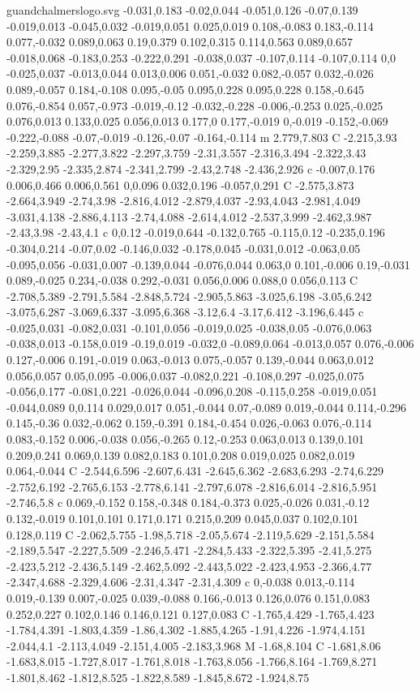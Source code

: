 \begin{filecontents}[noheader]{guandchalmerslogo.svg}
-0.031,0.183 -0.02,0.044 -0.051,0.126 -0.07,0.139 -0.019,0.013 -0.045,0.032 -0.019,0.051 0.025,0.019 0.108,-0.083 0.183,-0.114 0.077,-0.032 0.089,0.063 0.19,0.379 0.102,0.315 0.114,0.563 0.089,0.657 -0.018,0.068 -0.183,0.253 -0.222,0.291 -0.038,0.037 -0.107,0.114 -0.107,0.114 0,0 -0.025,0.037 -0.013,0.044 0.013,0.006 0.051,-0.032 0.082,-0.057 0.032,-0.026 0.089,-0.057 0.184,-0.108 0.095,-0.05 0.095,0.228 0.095,0.228 0.158,-0.645 0.076,-0.854 0.057,-0.973 -0.019,-0.12 -0.032,-0.228 -0.006,-0.253 0.025,-0.025 0.076,0.013 0.133,0.025 0.056,0.013 0.177,0 0.177,-0.019 0,-0.019 -0.152,-0.069 -0.222,-0.088 -0.07,-0.019 -0.126,-0.07 -0.164,-0.114 m 2.779,7.803 C -2.215,3.93 -2.259,3.885 -2.277,3.822 -2.297,3.759 -2.31,3.557 -2.316,3.494 -2.322,3.43 -2.329,2.95 -2.335,2.874 -2.341,2.799 -2.43,2.748 -2.436,2.926 c -0.007,0.176 0.006,0.466 0.006,0.561 0,0.096 0.032,0.196 -0.057,0.291 C -2.575,3.873 -2.664,3.949 -2.74,3.98 -2.816,4.012 -2.879,4.037 -2.93,4.043 -2.981,4.049 -3.031,4.138 -2.886,4.113 -2.74,4.088 -2.614,4.012 -2.537,3.999 -2.462,3.987 -2.43,3.98 -2.43,4.1 c 0,0.12 -0.019,0.644 -0.132,0.765 -0.115,0.12 -0.235,0.196 -0.304,0.214 -0.07,0.02 -0.146,0.032 -0.178,0.045 -0.031,0.012 -0.063,0.05 -0.095,0.056 -0.031,0.007 -0.139,0.044 -0.076,0.044 0.063,0 0.101,-0.006 0.19,-0.031 0.089,-0.025 0.234,-0.038 0.292,-0.031 0.056,0.006 0.088,0 0.056,0.113 C -2.708,5.389 -2.791,5.584 -2.848,5.724 -2.905,5.863 -3.025,6.198 -3.05,6.242 -3.075,6.287 -3.069,6.337 -3.095,6.368 -3.12,6.4 -3.17,6.412 -3.196,6.445 c -0.025,0.031 -0.082,0.031 -0.101,0.056 -0.019,0.025 -0.038,0.05 -0.076,0.063 -0.038,0.013 -0.158,0.019 -0.19,0.019 -0.032,0 -0.089,0.064 -0.013,0.057 0.076,-0.006 0.127,-0.006 0.191,-0.019 0.063,-0.013 0.075,-0.057 0.139,-0.044 0.063,0.012 0.056,0.057 0.05,0.095 -0.006,0.037 -0.082,0.221 -0.108,0.297 -0.025,0.075 -0.056,0.177 -0.081,0.221 -0.026,0.044 -0.096,0.208 -0.115,0.258 -0.019,0.051 -0.044,0.089 0,0.114 0.029,0.017 0.051,-0.044 0.07,-0.089 0.019,-0.044 0.114,-0.296 0.145,-0.36 0.032,-0.062 0.159,-0.391 0.184,-0.454 0.026,-0.063 0.076,-0.114 0.083,-0.152 0.006,-0.038 0.056,-0.265 0.12,-0.253 0.063,0.013 0.139,0.101 0.209,0.241 0.069,0.139 0.082,0.183 0.101,0.208 0.019,0.025 0.082,0.019 0.064,-0.044 C -2.544,6.596 -2.607,6.431 -2.645,6.362 -2.683,6.293 -2.74,6.229 -2.752,6.192 -2.765,6.153 -2.778,6.141 -2.797,6.078 -2.816,6.014 -2.816,5.951 -2.746,5.8 c 0.069,-0.152 0.158,-0.348 0.184,-0.373 0.025,-0.026 0.031,-0.12 0.132,-0.019 0.101,0.101 0.171,0.171 0.215,0.209 0.045,0.037 0.102,0.101 0.128,0.119 C -2.062,5.755 -1.98,5.718 -2.05,5.674 -2.119,5.629 -2.151,5.584 -2.189,5.547 -2.227,5.509 -2.246,5.471 -2.284,5.433 -2.322,5.395 -2.41,5.275 -2.423,5.212 -2.436,5.149 -2.462,5.092 -2.443,5.022 -2.423,4.953 -2.366,4.77 -2.347,4.688 -2.329,4.606 -2.31,4.347 -2.31,4.309 c 0,-0.038 0.013,-0.114 0.019,-0.139 0.007,-0.025 0.039,-0.088 0.166,-0.013 0.126,0.076 0.151,0.083 0.252,0.227 0.102,0.146 0.146,0.121 0.127,0.083 C -1.765,4.429 -1.765,4.423 -1.784,4.391 -1.803,4.359 -1.86,4.302 -1.885,4.265 -1.91,4.226 -1.974,4.151 -2.044,4.1 -2.113,4.049 -2.151,4.005 -2.183,3.968 M -1.68,8.104 C -1.681,8.06 -1.683,8.015 -1.727,8.017 -1.761,8.018 -1.763,8.056 -1.766,8.164 -1.769,8.271 -1.801,8.462 -1.812,8.525 -1.822,8.589 -1.845,8.672 -1.924,8.75 
\end{filecontents}
